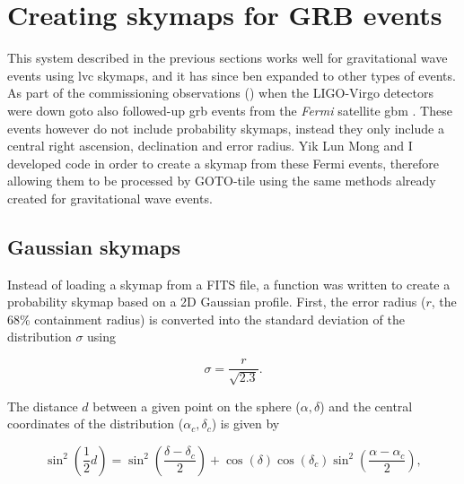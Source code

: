 \section{Creating skymaps for GRB events}
\label{sec:grb_skymaps}
\begin{colsection}


\begin{colsection}


This system described in the previous sections works well for gravitational wave events using \gls{lvc} skymaps, and it has since ben expanded to other types of events. As part of the commissioning observations () when the LIGO-Virgo detectors were down \gls{goto} also followed-up \gls{grb} events from the \textit{Fermi} satellite \gls{gbm} \citep{Fermi_GBM}. These events however do not include probability skymaps, instead they only include a central right ascension, declination and error radius. Yik Lun Mong and I developed code in order to create a skymap from these Fermi events, therefore allowing them to be processed by GOTO-tile using the same methods already created for gravitational wave events.

\end{colsection}


\subsection{Gaussian skymaps}
\label{sec:gaussian_skymaps}
\begin{colsection}

Instead of loading a skymap from a FITS file, a function was written to create a probability skymap based on a 2D Gaussian profile. First, the error radius ($r$, the 68\% containment radius) is converted into the standard deviation of the distribution $\sigma$ using

\begin{equation}
    \sigma = \frac{r}{\sqrt{2.3}}.
    \label{eq:gaussian_sigma}
\end{equation}

The distance $d$ between a given point on the sphere ($\alpha, \delta$) and the central coordinates of the distribution ($\alpha_c, \delta_c$) is given by

\begin{equation}
    \sin^2 \left ( \frac{1}{2} d \right )
    = \sin^2 \left ( \frac{\delta-\delta_c}{2} \right)
      + \cos (\delta) \cos (\delta_c) \sin^2 \left ( \frac{\alpha-\alpha_c}{2} \right),
    \label{eq:gaussian_distance}
\end{equation}


\end{colsection}
\end{colsection}
